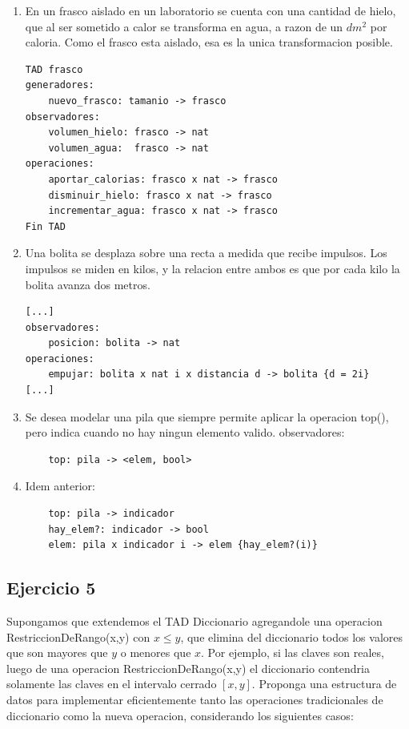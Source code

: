 \documentclass[10pt, a4paper]{report}
\begin{document}
\begin{enumerate}
 \item En un frasco aislado en un laboratorio se cuenta con una cantidad de hielo, que al ser sometido a calor se transforma en agua, a razon de un $dm^2$ por caloria. Como el frasco esta aislado, esa es la unica transformacion posible.

 \begin{verbatim}
TAD frasco
generadores:
    nuevo_frasco: tamanio -> frasco
observadores:
    volumen_hielo: frasco -> nat
    volumen_agua:  frasco -> nat
operaciones:
    aportar_calorias: frasco x nat -> frasco
    disminuir_hielo: frasco x nat -> frasco
    incrementar_agua: frasco x nat -> frasco
Fin TAD
\end{verbatim}

 \item Una bolita se desplaza sobre una recta a medida que recibe impulsos. Los impulsos se miden en kilos, y la relacion entre ambos es que por cada kilo la bolita avanza dos metros.
\begin{verbatim}
[...]
observadores:
    posicion: bolita -> nat
operaciones:
    empujar: bolita x nat i x distancia d -> bolita {d = 2i}
[...]
\end{verbatim}


 \item Se desea modelar una pila que siempre permite aplicar la operacion top(), pero indica cuando no hay ningun elemento valido.
observadores:
\begin{verbatim}
    top: pila -> <elem, bool>
\end{verbatim}

 \item Idem anterior:
\begin{verbatim}
    top: pila -> indicador
    hay_elem?: indicador -> bool
    elem: pila x indicador i -> elem {hay_elem?(i)}
\end{verbatim}

\end{enumerate}

\subsection*{Ejercicio 5}    
Supongamos que extendemos el TAD Diccionario agregandole una operacion RestriccionDeRango(x,y) con $x \leq y$, que elimina del diccionario todos los valores que son mayores que $y$ o menores que $x$. Por ejemplo, si las claves son reales, luego de una operacion RestriccionDeRango(x,y) el diccionario contendria solamente las claves en el intervalo cerrado $[x, y]$. Proponga una estructura de datos para implementar eficientemente tanto las operaciones tradicionales de diccionario como la nueva operacion, considerando los siguientes casos:
\end{document}
